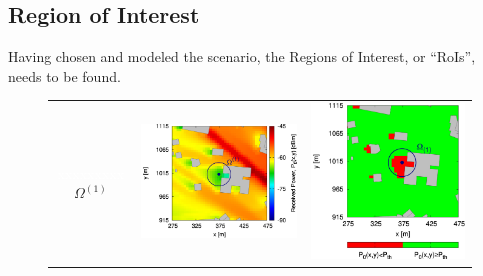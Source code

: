 \subsection{Region of Interest}
Having chosen and modeled the scenario, the Regions of Interest,
or {}``RoIs'', needs to be found. 
\begin{figure}[H]
\begin{center}
\begin{tabular}{ccc}
\begin{sideways}\textcolor{white}{xxxxxxxxx}$\Omega^{(1)}$\end{sideways}&
\includegraphics[scale=0.1]{./Figure/Planning.EM/RoI1/1/Fig.Received.Power.ZOOM.H-QoS-01.Reference.jpg}&\includegraphics[scale=0.1]{./Figure/Planning.EM/RoI1/1/Fig.Received.Power.ZOOM.RoI.Reference.Threshold.-65dBm.jpg}\tabularnewline

\end{tabular}
\end{center}
\end{figure}

